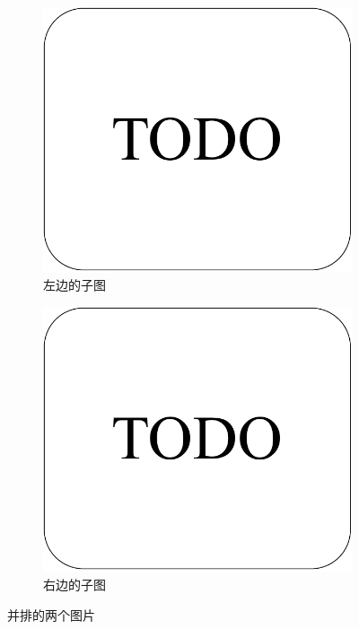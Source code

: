 \documentclass[12]{ctexart}
\begin{document}
\begin{figure}[!ht]
    \begin{subfigure}[t]{0.48\linewidth}
        \centering
        \includegraphics[width=0.9\linewidth]{imgs/TODO.pdf}
        \caption{左边的子图}
        \label{fig_subfig_1}
    \end{subfigure}
    \begin{subfigure}[t]{0.48\linewidth}
        \centering
        \includegraphics[width=0.9\linewidth]{imgs/TODO.pdf}
        \caption{右边的子图}
        \label{fig_subfig_2}
    \end{subfigure}
    \caption{并排的两个图片}
    \label{fig_two}
\end{figure}
\end{document}

